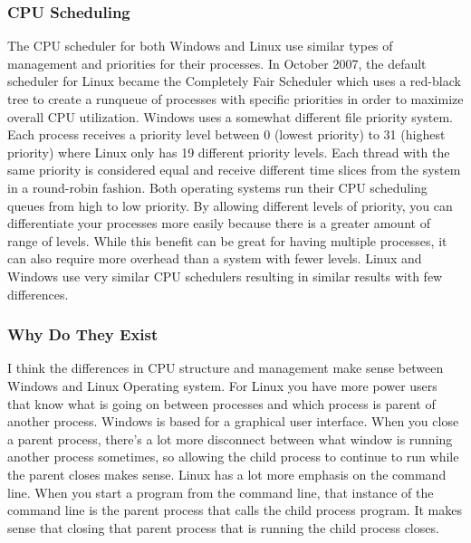 \documentclass[draftclsnofoot, onecolumn, compsoc, 10pt]{IEEEtran}
\begin{document}
\subsubsection{CPU Scheduling}

The CPU scheduler for both Windows and Linux use similar types of management and priorities for their processes. In October 2007, the default scheduler for Linux became the Completely Fair Scheduler which uses a red-black tree to create a runqueue of processes with specific priorities in order to maximize overall CPU utilization\cite{CFS}. Windows uses a somewhat different file priority system. Each process receives a priority level between 0 (lowest priority) to 31 (highest priority) where Linux only has 19 different priority levels. Each thread with the same priority is considered equal and receive different time slices from the system in a round-robin fashion\cite{microsoft}. Both operating systems run their CPU scheduling queues from high to low priority. By allowing different levels of priority, you can differentiate your processes more easily because there is a greater amount of range of levels. While this benefit can be great for having multiple processes, it can also require more overhead than a system with fewer levels. Linux and Windows use very similar CPU schedulers resulting in similar results with few differences. 


\subsubsection{Why Do They Exist}

I think the differences in CPU structure and management make sense between Windows and Linux Operating system. For Linux you have more power users that know what is going on between processes and which process is parent of another process. Windows is based for a graphical user interface. When you close a parent process, there's a lot more disconnect between what window is running another process sometimes, so allowing the child process to continue to run while the parent closes makes sense. Linux has a lot more emphasis on the command line. When you start a program from the command line, that instance of the command line is the parent process that calls the child process program. It makes sense that closing that parent process that is running the child process closes.
\end{document}
